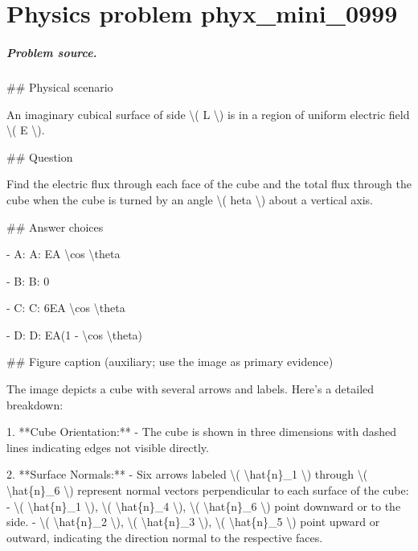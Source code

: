 
\chapter{Physics problem phyx\_mini\_0999}
\label{ch:PhyXMiniProblems_problem_phyx_mini_0999}

\paragraph{Problem source.}
\#\# Physical scenario

An imaginary cubical surface of side \textbackslash{}( L \textbackslash{}) is in a region of uniform electric field \textbackslash{}( E \textbackslash{}).

\#\# Question

Find the electric flux through each face of the cube and the total flux through the cube when the cube is turned by an angle \textbackslash{}( 	heta \textbackslash{}) about a vertical axis.

\#\# Answer choices

- A: A: EA \textbackslash{}cos \textbackslash{}theta

- B: B: 0

- C: C: 6EA \textbackslash{}cos \textbackslash{}theta

- D: D: EA(1 - \textbackslash{}cos \textbackslash{}theta)

\#\# Figure caption (auxiliary; use the image as primary evidence)

The image depicts a cube with several arrows and labels. Here's a detailed breakdown:

1. **Cube Orientation:**
   - The cube is shown in three dimensions with dashed lines indicating edges not visible directly.

2. **Surface Normals:**
   - Six arrows labeled \textbackslash{}( \textbackslash{}hat\{n\}\_1 \textbackslash{}) through \textbackslash{}( \textbackslash{}hat\{n\}\_6 \textbackslash{}) represent normal vectors perpendicular to each surface of the cube:
     - \textbackslash{}( \textbackslash{}hat\{n\}\_1 \textbackslash{}), \textbackslash{}( \textbackslash{}hat\{n\}\_4 \textbackslash{}), \textbackslash{}( \textbackslash{}hat\{n\}\_6 \textbackslash{}) point downward or to the side.
     - \textbackslash{}( \textbackslash{}hat\{n\}\_2 \textbackslash{}), \textbackslash{}( \textbackslash{}hat\{n\}\_3 \textbackslash{}), \textbackslash{}( \textbackslash{}hat\{n\}\_5 \textbackslash{}) point upward or outward, indicating the direction normal to the respective faces.

